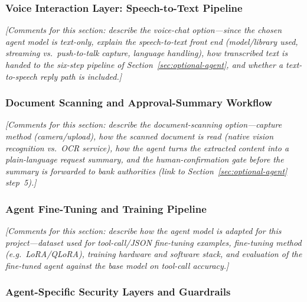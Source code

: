 \documentclass[12pt,a4paper]{report}
\begin{document}
\subsubsection{Voice Interaction Layer: Speech-to-Text Pipeline}
\label{sec:voice-interaction-layer}

\vspace{1.5cm}
\noindent\textit{[Comments for this section: describe the voice-chat option---since the chosen agent model is text-only, explain the speech-to-text front end (model/library used, streaming vs.\ push-to-talk capture, language handling), how transcribed text is handed to the six-step pipeline of Section~\ref{sec:optional-agent}, and whether a text-to-speech reply path is included.]}
\vspace{1.5cm}

\subsubsection{Document Scanning and Approval-Summary Workflow}
\label{sec:document-scanning-workflow}

\vspace{1.5cm}
\noindent\textit{[Comments for this section: describe the document-scanning option---capture method (camera/upload), how the scanned document is read (native vision recognition vs.\ OCR service), how the agent turns the extracted content into a plain-language request summary, and the human-confirmation gate before the summary is forwarded to bank authorities (link to Section~\ref{sec:optional-agent} step~5).]}
\vspace{1.5cm}

\subsubsection{Agent Fine-Tuning and Training Pipeline}
\label{sec:agent-finetuning-pipeline}

\vspace{1.5cm}
\noindent\textit{[Comments for this section: describe how the agent model is adapted for this project---dataset used for tool-call/JSON fine-tuning examples, fine-tuning method (e.g.\ LoRA/QLoRA), training hardware and software stack, and evaluation of the fine-tuned agent against the base model on tool-call accuracy.]}
\vspace{1.5cm}

\subsubsection{Agent-Specific Security Layers and Guardrails}
\label{sec:agent-security-guardrails}
\end{document}

